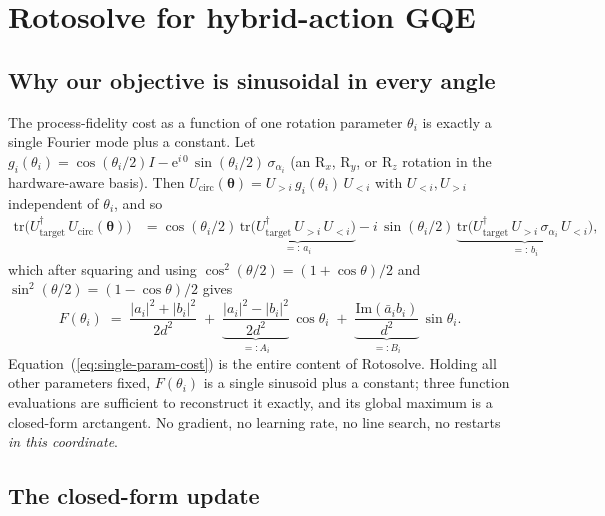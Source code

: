 \documentclass[11pt,a4paper]{article}
\newcommand{\Utarget}{U_{\text{target}}}
\newcommand{\Ucirc}{U_{\text{circ}}}
\newcommand{\E}{\mathrm{e}}
\begin{document}
\section{Rotosolve for hybrid-action GQE}

\subsection{Why our objective is sinusoidal in every angle}

The process-fidelity cost as a function of one rotation parameter $\theta_i$
is exactly a single Fourier mode plus a constant. Let $g_i(\theta_i) = \cos(\theta_i / 2) I - \E^{i\, 0}\,\sin(\theta_i / 2)\,\sigma_{\alpha_i}$
(an $\mathrm{R}_x$, $\mathrm{R}_y$, or $\mathrm{R}_z$ rotation in the
hardware-aware basis). Then $\Ucirc(\bm\theta) = U_{>i}\, g_i(\theta_i)\, U_{<i}$
with $U_{<i}, U_{>i}$ independent of $\theta_i$, and so
\begin{align*}
\mathrm{tr}\bigl(\Utarget^\dagger\,\Ucirc(\bm\theta)\bigr)
&= \cos(\theta_i / 2)\,\underbrace{\mathrm{tr}\bigl(\Utarget^\dagger\, U_{>i}\, U_{<i}\bigr)}_{=:\,a_i}
- i\,\sin(\theta_i / 2)\,\underbrace{\mathrm{tr}\bigl(\Utarget^\dagger\, U_{>i}\, \sigma_{\alpha_i}\, U_{<i}\bigr)}_{=:\,b_i},
\end{align*}
which after squaring and using $\cos^2(\theta/2) = (1 + \cos\theta)/2$
and $\sin^2(\theta/2) = (1 - \cos\theta)/2$ gives
\begin{equation}
\boxed{\;
F(\theta_i)
\;=\;
\frac{|a_i|^2 + |b_i|^2}{2 d^2}
\;+\;
\underbrace{\frac{|a_i|^2 - |b_i|^2}{2 d^2}}_{=: A_i}\,\cos\theta_i
\;+\;
\underbrace{\frac{\mathrm{Im}(\bar a_i b_i)}{d^2}}_{=: B_i}\,\sin\theta_i.
\;}
\label{eq:single-param-cost}
\end{equation}
Equation~(\ref{eq:single-param-cost}) is the entire content of Rotosolve.
Holding all other parameters fixed, $F(\theta_i)$ is a single sinusoid
plus a constant; three function evaluations are sufficient to reconstruct
it exactly, and its global maximum is a closed-form arctangent. No
gradient, no learning rate, no line search, no restarts \emph{in this
coordinate}.

\subsection{The closed-form update}
\end{document}
